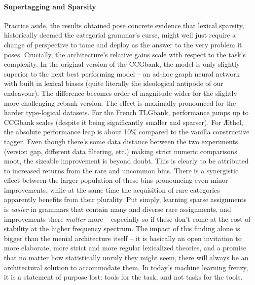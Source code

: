 \paragraph{Supertagging and Sparsity}
Practice aside, the results obtained pose concrete evidence that lexical sparsity, historically deemed the categorial grammar's curse, might well just require a change of perspective to tame and deploy as the answer to the very problem it poses.
Crucially, the architecture's relative gains scale with respect to the task's complexity.
In the original version of the CCGbank, the model is only slightly superior to the next best performing model -- an ad-hoc graph neural network with built in lexical biases (quite literally the ideological antipode of our endeavour).
The difference becomes order of magnitude wider for the slightly more challenging rebank version.
The effect is maximally pronounced for the harder type-logical datasets.
For the French TLGbank, performance jumps up to CCGbank scales (despite it being significantly smaller and sparser).
For \AE thel, the absolute performance leap is about 10\% compared to the vanilla constructive tagger.
Even though there's some data distance between the two experiments (version gap, different data filtering, etc.) making strict numeric comparisons moot, the sizeable improvement is beyond doubt.
This is clearly to be attributed to increased returns from the rare and uncommon bins.
There is a synergistic effect between the larger population of these bins pronouncing even minor improvements, while at the same time the acquisition of rare categories apparently benefits from their plurality.
Put simply, learning sparse assignments is \textit{easier} in grammars that contain many and diverse rare assignments, and improvements there \textit{matter} more -- especially so if these don't come at the cost of stability at the higher frequency spectrum.
The impact of this finding alone is bigger than the menial architecture itself -- it is basically an open invitation to more elaborate, more strict and more regular lexicalized theories, and a promise that no matter how statistically unruly they might seem, there will always be an architectural solution to accommodate them.
In today's machine learning frenzy, it is a statement of purpose lost: tools for the task, and not tasks for the tools.

